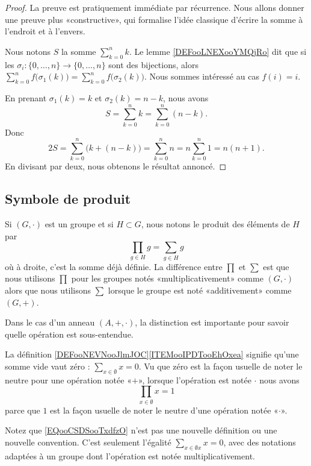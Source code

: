\begin{proof}
	La preuve est pratiquement immédiate par récurrence. Nous allons donner une preuve plus «constructive», qui formalise l'idée classique d'écrire la somme à l'endroit et à l'envers.


	Nous notons \( S\) la somme \( \sum_{k=0}^nk\). Le lemme \ref{DEFooLNEXooYMQjRo} dit que si les \( \sigma_i\colon \{ 0,\ldots, n \}\to \{ 0,\ldots, n \}\) sont des bijections, alors \( \sum_{k=0}^nf\big( \sigma_1(k) \big)=\sum_{k=0}^nf\big( \sigma_2(k) \big)\). Nous sommes intéressé au cas \( f(i)=i\).

	En prenant \( \sigma_1(k)=k\) et \( \sigma_2(k)=n-k\), nous avons
	\begin{equation}
		S=\sum_{k=0}^nk=\sum_{k=0}^n(n-k).
	\end{equation}
	Donc
	\begin{equation}
		2S=\sum_{k=0}^n\big( k+(n-k) \big)=\sum_{k=0}^nn=n\sum_{k=0}^n1=n(n+1).
	\end{equation}
	En divisant par deux, nous obtenons le résultat annoncé.
\end{proof}


\subsection{Symbole de produit}

\begin{normaltext}      \label{NORMooDBOFooQCwbOY}
	Si \( (G,\cdot)\) est un groupe et si \( H\subset G\), nous notons le produit des éléments de \( H\) par
	\begin{equation}
		\prod_{g\in H }g=\sum_{g\in H}g
	\end{equation}
	où à droite, c'est la somme déjà définie. La différence entre \( \prod\) et \( \sum\) est que nous utilisons \( \prod\) pour les groupes notés «multiplicativement» comme \( (G,\cdot)\) alors que nous utilisons \( \sum\) lorsque le groupe est noté «additivement» comme \( (G,+)\).

	Dans le cas d'un anneau \( (A,+,\cdot)\), la distinction est importante pour savoir quelle opération est sous-entendue.

	La définition \ref{DEFooNEVNooJlmJOC}\ref{ITEMooIPDTooEhOxea} signifie qu'une somme vide vaut zéro : \( \sum_{x\in \emptyset}x=0\). Vu que zéro est la façon usuelle de noter le neutre pour une opération notée «\( +\)», lorsque l'opération est notée \( \cdot\) nous avons
	\begin{equation}        \label{EQooCSDSooTxdfzO}
		\prod_{x\in\emptyset}x=1
	\end{equation}
	parce que \( 1\) est la façon usuelle de noter le neutre d'une opération notée «\( \cdot\)».

	Notez que \eqref{EQooCSDSooTxdfzO} n'est pas une nouvelle définition ou une nouvelle convention. C'est seulement l'égalité \( \sum_{x\in\emptyset x}x=0\), avec des notations adaptées à un groupe dont l'opération est notée multiplicativement.
\end{normaltext}

